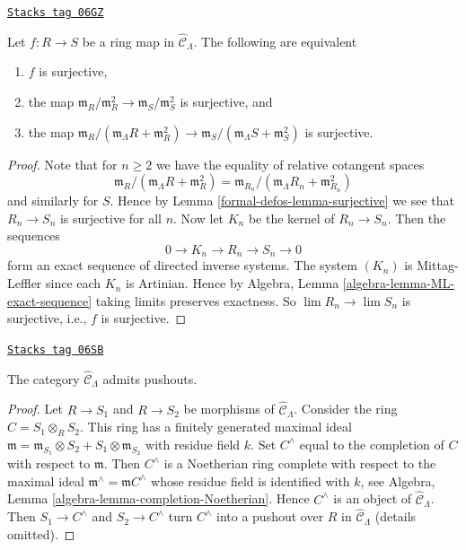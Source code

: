 \begin{lemma}
\label{formal-defos-lemma-surjective-cotangent-space}
\href{https://stacks.math.columbia.edu/tag/06GZ}{\texttt{Stacks tag 06GZ}}

Let $f: R \to S$ be a ring map in $\widehat{\mathcal{C}}_\Lambda$.
The following are equivalent
\begin{enumerate}
\item $f$ is surjective,
\item the map
$\mathfrak m_R/\mathfrak m_R^2 \to \mathfrak m_S/\mathfrak m_S^2$
is surjective, and
\item the map
$\mathfrak m_R/(\mathfrak m_\Lambda R + \mathfrak m_R^2) \to
\mathfrak m_S/(\mathfrak m_\Lambda S + \mathfrak m_S^2)$
is surjective.
\end{enumerate}
\end{lemma}

\begin{proof}
Note that for $n \geq 2$ we have the equality of relative cotangent spaces
$$
\mathfrak m_R/(\mathfrak m_\Lambda R + \mathfrak m_R^2)
=
\mathfrak m_{R_n}/(\mathfrak m_\Lambda R_n + \mathfrak m_{R_n}^2)
$$
and similarly for $S$. Hence by
Lemma \ref{formal-defos-lemma-surjective}
we see that $R_n \to S_n$ is surjective for all $n$.
Now let $K_n$ be the kernel of $R_n \to S_n$.  Then the sequences
$$
0 \to K_n \to R_n \to S_n \to 0
$$
form an exact sequence of directed inverse systems. The system $(K_n)$ is
Mittag-Leffler since each $K_n$ is Artinian. Hence by
Algebra, Lemma \ref{algebra-lemma-ML-exact-sequence}
taking limits preserves exactness. So
$\lim R_n \to \lim S_n$ is surjective, i.e., $f$ is surjective.
\end{proof}

\begin{lemma}
\label{formal-defos-lemma-CLambdahat-pushouts}
\href{https://stacks.math.columbia.edu/tag/06SB}{\texttt{Stacks tag 06SB}}

The category $\widehat{\mathcal{C}}_\Lambda$ admits pushouts.
\end{lemma}

\begin{proof}
Let $R \to S_1$ and $R \to S_2$ be morphisms of
$\widehat{\mathcal{C}}_\Lambda$. Consider the ring
$C = S_1 \otimes_R S_2$.
This ring has a finitely generated maximal ideal
$\mathfrak m = \mathfrak m_{S_1} \otimes S_2 +
S_1 \otimes \mathfrak m_{S_2}$ with residue field $k$.
Set $C^\wedge$ equal to the completion of $C$ with respect to $\mathfrak m$.
Then $C^\wedge$ is a Noetherian ring complete with respect to
the maximal ideal $\mathfrak m^\wedge = \mathfrak mC^\wedge$
whose residue field is identified with $k$, see
Algebra, Lemma \ref{algebra-lemma-completion-Noetherian}.
Hence $C^\wedge$ is an object of $\widehat{\mathcal{C}}_\Lambda$.
Then $S_1 \to C^\wedge$ and $S_2 \to C^\wedge$ turn $C^\wedge$
into a pushout over $R$ in $\widehat{\mathcal{C}}_\Lambda$ (details omitted).
\end{proof}

